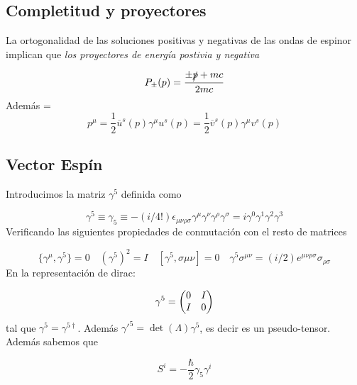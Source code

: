 \subsection{Completitud y proyectores}

La ortogonalidad de las soluciones positivas y negativas de las ondas de espinor implican que \textit{los proyectores de energía postivia y negativa} 

\begin{equation}
	P_\pm (p) = \frac{\pm \slashed{p} + mc}{2mc}
\end{equation}
Además 
=
\begin{equation}
	p^\mu = \frac{1}{2} \overline{u}^s(p)\gamma^\mu u^s(p)=
	 \frac{1}{2} \overline{v}^s(p)\gamma^\mu v^s(p)
\end{equation}

\subsection{Vector Espín}

Introducimos la matriz $\gamma^5$ definida como

\begin{equation}
	\gamma^5 \equiv \gamma_5 \equiv -(i/4!) \epsilon_{\mu \nu \rho \sigma} \gamma^\mu \gamma^\nu \gamma^\rho \gamma^\sigma = i \gamma^0 \gamma^1 \gamma^2 \gamma^3
\end{equation}
Verificando las siguientes propiedades de conmutación con el resto de matrices

\begin{equation}
	\{\gamma^\mu,\gamma^5\}=0\quad (\gamma^5)^2= I \quad [\gamma^5,\sigma{\mu\nu}]=0 \quad \gamma^5 \sigma^{\mu \nu} = (i/2)e^{\mu \nu \rho \sigma} \sigma_{\rho \sigma}
\end{equation}
En la representación de dirac:

\begin{equation}
	\gamma^5 = \mqty(0&I\\I&0)
\end{equation}
tal que $\gamma^5=\gamma^{5\dagger}$. Además $\gamma'^5 =\det(\Lambda)\gamma^5$, es decir es un pseudo-tensor. Además sabemos que 

\begin{equation}
	S^i = - \frac{\hbar}{2} \gamma_5 \gamma^i
\end{equation}









